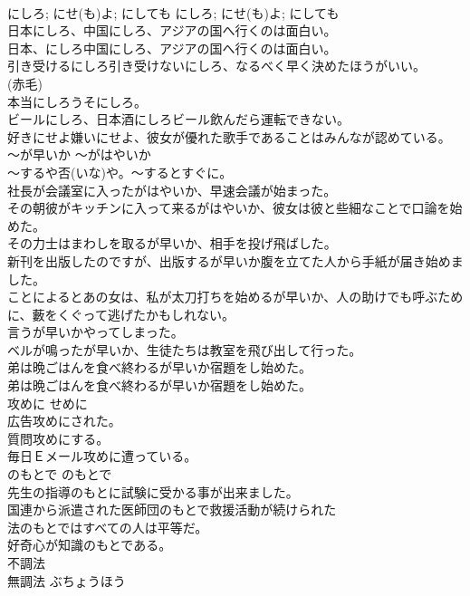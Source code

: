 \documentclass[8pt]{extreport}
\begin{document}
\begin{CJK}{UTF8}{min}
\\	にしろ; にせ(も)よ; にしても	にしろ; にせ(も)よ; にしても	
\\	日本にしろ、中国にしろ、アジアの国へ行くのは面白い。	
\\	日本、にしろ中国にしろ、アジアの国へ行くのは面白い。  
\\	引き受けるにしろ引き受けないにしろ、なるべく早く決めたほうがいい。  
\\	(赤毛)
\\	本当にしろうそにしろ。 
\\	ビールにしろ、日本酒にしろビール飲んだら運転できない。  
\\	好きにせよ嫌いにせよ、彼女が優れた歌手であることはみんなが認めている。  
\\	〜が早いか	〜がはやいか	
\\	〜するや否(いな)や。〜するとすぐに。	
\\	社長が会議室に入ったがはやいか、早速会議が始まった。  
\\	その朝彼がキッチンに入って来るがはやいか、彼女は彼と些細なことで口論を始めた。  
\\	その力士はまわしを取るが早いか、相手を投げ飛ばした。  
\\	新刊を出版したのですが、出版するが早いか腹を立てた人から手紙が届き始めました。  
\\	ことによるとあの女は、私が太刀打ちを始めるが早いか、人の助けでも呼ぶために、藪をくぐって逃げたかもしれない。  
\\	言うが早いかやってしまった。  
\\	ベルが鳴ったが早いか、生徒たちは教室を飛び出して行った。  
\\	弟は晩ごはんを食べ終わるが早いか宿題をし始めた。  
\\	弟は晩ごはんを食べ終わるが早いか宿題をし始めた。 
\\	攻めに	せめに	
\\	広告攻めにされた。  
\\	質問攻めにする。   
\\	毎日Ｅメール攻めに遭っている。  
\\	のもとで	のもとで	
\\	先生の指導のもとに試験に受かる事が出来ました。  
\\	国連から派遣された医師団のもとで救援活動が続けられた  
\\	法のもとではすべての人は平等だ。   
\\	好奇心が知識のもとである。  
\\	不調法 
\\	無調法	ぶちょうほう	

\end{CJK}
\end{document}
